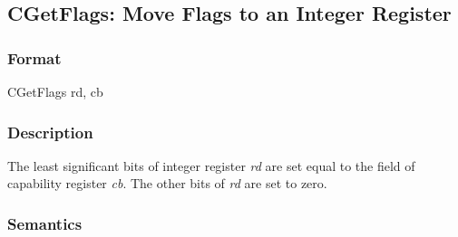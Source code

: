 \clearpage
{}
{}
\subsection*{CGetFlags: Move Flags to an Integer Register}

\subsubsection*{Format}

CGetFlags rd, cb

\begin{center}
\end{center}

\subsubsection*{Description}

The least significant bits of integer register \emph{rd} are set
equal to the \cflags{} field of capability register \emph{cb}.
The other bits of \emph{rd} are set to zero.

\subsubsection*{Semantics}


